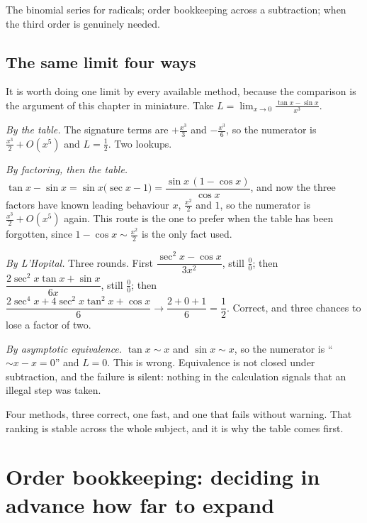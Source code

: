\begin{seealsob}The binomial series for radicals; order bookkeeping across a subtraction; when the third order is genuinely needed.\end{seealsob}

\subsection{The same limit four ways}

It is worth doing one limit by every available method, because the comparison is the argument of this chapter in miniature. Take $\displaystyle L=\lim_{x\to0}\frac{\tan x-\sin x}{x^{3}}$.

\emph{By the table.} The signature terms are $+\tfrac{x^{3}}{3}$ and $-\tfrac{x^{3}}{6}$, so the numerator is $\tfrac{x^{3}}{2}+O(x^{5})$ and $L=\tfrac12$. Two lookups.

\emph{By factoring, then the table.} $\tan x-\sin x=\sin x\bigl(\sec x-1\bigr)=\dfrac{\sin x\,(1-\cos x)}{\cos x}$, and now the three factors have known leading behaviour $x$, $\tfrac{x^{2}}{2}$ and $1$, so the numerator is $\tfrac{x^{3}}{2}+O(x^{5})$ again. This route is the one to prefer when the table has been forgotten, since $1-\cos x\sim\tfrac{x^{2}}{2}$ is the only fact used.

\emph{By L'Hopital.} Three rounds. First $\dfrac{\sec^{2}x-\cos x}{3x^{2}}$, still $\tfrac00$; then $\dfrac{2\sec^{2}x\tan x+\sin x}{6x}$, still $\tfrac00$; then $\dfrac{2\sec^{4}x+4\sec^{2}x\tan^{2}x+\cos x}{6}\to\dfrac{2+0+1}{6}=\dfrac12$. Correct, and three chances to lose a factor of two.

\emph{By asymptotic equivalence.} $\tan x\sim x$ and $\sin x\sim x$, so the numerator is ``$\sim x-x=0$'' and $L=0$. This is wrong. Equivalence is not closed under subtraction, and the failure is silent: nothing in the calculation signals that an illegal step was taken.

Four methods, three correct, one fast, and one that fails without warning. That ranking is stable across the whole subject, and it is why the table comes first.

\section{Order bookkeeping: deciding in advance how far to expand}


